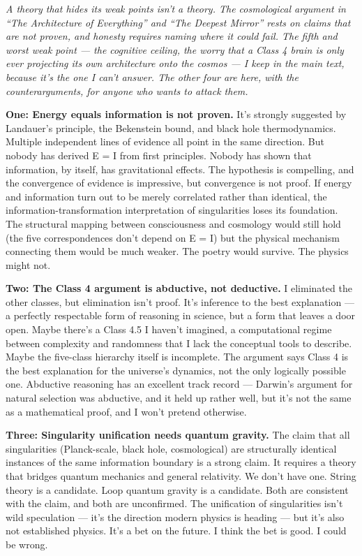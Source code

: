 \documentclass[11pt, twoside, openright]{book}
\begin{document}
\textit{A theory that hides its weak points isn't a theory. The cosmological argument in ``The Architecture of Everything'' and ``The Deepest Mirror'' rests on claims that are not proven, and honesty requires naming where it could fail. The fifth and worst weak point --- the cognitive ceiling, the worry that a Class 4 brain is only ever projecting its own architecture onto the cosmos --- I keep in the main text, because it's the one I can't answer. The other four are here, with the counterarguments, for anyone who wants to attack them.}

\textbf{One: Energy equals information is not proven.} It's strongly suggested by Landauer's principle, the Bekenstein bound, and black hole thermodynamics. Multiple independent lines of evidence all point in the same direction. But nobody has derived E = I from first principles. Nobody has shown that information, by itself, has gravitational effects. The hypothesis is compelling, and the convergence of evidence is impressive, but convergence is not proof. If energy and information turn out to be merely correlated rather than identical, the information-transformation interpretation of singularities loses its foundation. The structural mapping between consciousness and cosmology would still hold (the five correspondences don't depend on E = I) but the physical mechanism connecting them would be much weaker. The poetry would survive. The physics might not.

\textbf{Two: The Class 4 argument is abductive, not deductive.} I eliminated the other classes, but elimination isn't proof. It's inference to the best explanation --- a perfectly respectable form of reasoning in science, but a form that leaves a door open. Maybe there's a Class 4.5 I haven't imagined, a computational regime between complexity and randomness that I lack the conceptual tools to describe. Maybe the five-class hierarchy itself is incomplete. The argument says Class 4 is the best explanation for the universe's dynamics, not the only logically possible one. Abductive reasoning has an excellent track record --- Darwin's argument for natural selection was abductive, and it held up rather well, but it's not the same as a mathematical proof, and I won't pretend otherwise.

\textbf{Three: Singularity unification needs quantum gravity.} The claim that all singularities (Planck-scale, black hole, cosmological) are structurally identical instances of the same information boundary is a strong claim. It requires a theory that bridges quantum mechanics and general relativity. We don't have one. String theory is a candidate. Loop quantum gravity is a candidate. Both are consistent with the claim, and both are unconfirmed. The unification of singularities isn't wild speculation --- it's the direction modern physics is heading --- but it's also not established physics. It's a bet on the future. I think the bet is good. I could be wrong.
\end{document}
